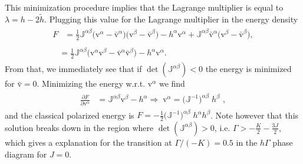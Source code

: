 This minimization procedure implies that the Lagrange multiplier is equal to $\lambda = h-2 \tilde{h}$.
Plugging this value for the Lagrange multiplier in the energy density
\begin{align}
\begin{split}
    F     &=
    \frac{1}{2} \mathbb{J}^{\alpha\beta}  \big( \mathrm{v}^\alpha-\bar{\mathrm{v}}^\alpha\big)\big( \mathrm{v}^\beta-\bar{\mathrm{v}}^\beta\big)  -  h^\alpha   \mathrm{v}^\alpha +\mathbb{J}^{\alpha\beta}\bar{\mathrm{v}}^\alpha \big( \mathrm{v}^\beta-\bar{\mathrm{v}}^\beta\big) ,
\end{split}\\
\begin{split}
         &=
    \frac{1}{2} \mathbb{J}^{\alpha\beta}  \big( \mathrm{v}^\alpha\mathrm{v}^\beta-\bar{\mathrm{v}}^\alpha\bar{\mathrm{v}}^\beta\big)   -  h^\alpha   \mathrm{v}^\alpha  .
\end{split}
\end{align}
From that, we immediately see that if $\det \left(\mathbb{J}^{\alpha\beta}\right)<0$  the energy is minimized for $\bar{\mathrm{v}}=0$. Minimizing the energy w.r.t. $\mathrm{v}^\alpha$ we find
\begin{align}
\begin{split}
    \frac{\partial F}{\partial \mathrm{v}^\alpha}      &=
   \mathbb{J}^{\alpha\beta}  \mathrm{v}^\beta
   -  h^\alpha
   \Rightarrow
   \boxed{\;\mathrm{v}^\alpha = \big(\mathbb{J}^{-1}\big)^{\alpha\beta} \; h^\beta   \, } \, ,
\end{split}
\end{align}
and the classical polarized energy is
$F=-\frac{1}{2} \big(\mathbb{J}^{-1}\big)^{\alpha\beta} \; h^\alpha h^\beta$. Note however that this solution breaks down in the region where $\det \left(\mathbb{J}^{\alpha\beta}\right)>0$, i.e. $\Gamma > -\frac{K}{2}-\frac{3J}{2}$, which gives a explanation for the transition at $\Gamma/(-K)=0.5$ in the $h\Gamma$ phase  diagram for $J=0$.

